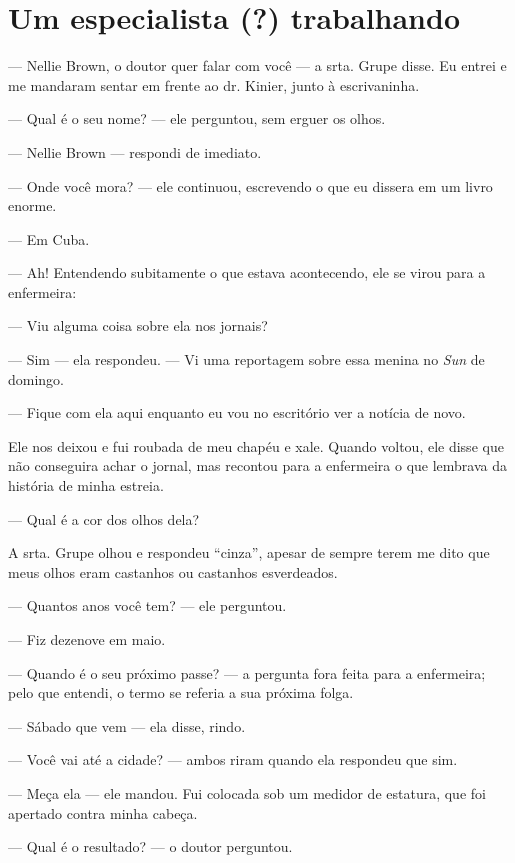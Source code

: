 \label{section-5}

\chapter{Um especialista (?)
trabalhando}\label{capuxedtulo-ix-um-especialista-trabalhando}

--- Nellie Brown, o doutor quer falar com você --- a srta. Grupe disse.
Eu entrei e me mandaram sentar em frente ao dr. Kinier, junto à
escrivaninha.

--- Qual é o seu nome? --- ele perguntou, sem erguer os olhos.

--- Nellie Brown --- respondi de imediato.

--- Onde você mora? --- ele continuou, escrevendo o que eu dissera em um
livro enorme.

--- Em Cuba.

--- Ah! Entendendo subitamente o que estava acontecendo, ele se virou
para a enfermeira:

--- Viu alguma coisa sobre ela nos jornais?

--- Sim --- ela respondeu. --- Vi uma reportagem sobre essa menina no
\emph{Sun} de domingo.

--- Fique com ela aqui enquanto eu vou no escritório ver a notícia de
novo.

Ele nos deixou e fui roubada de meu chapéu e xale. Quando voltou, ele
disse que não conseguira achar o jornal, mas recontou para a enfermeira
o que lembrava da história de minha estreia.

--- Qual é a cor dos olhos dela?

A srta. Grupe olhou e respondeu ``cinza'', apesar de sempre terem me
dito que meus olhos eram castanhos ou castanhos esverdeados.

--- Quantos anos você tem? --- ele perguntou. 

--- Fiz dezenove em maio.

--- Quando é o seu próximo passe? --- a pergunta fora feita para a
enfermeira; pelo que entendi, o termo se referia a sua próxima folga.

--- Sábado que vem --- ela disse, rindo.

--- Você vai até a cidade? --- ambos riram quando ela respondeu que sim.

--- Meça ela --- ele mandou. Fui colocada sob um medidor de estatura,
que foi apertado contra minha cabeça.

--- Qual é o resultado? --- o doutor perguntou.

